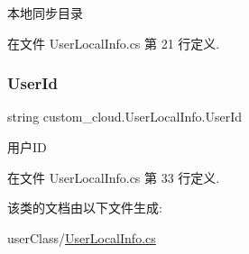 本地同步目录 



在文件 User\+Local\+Info.\+cs 第 21 行定义.

\mbox{\label{classcustom__cloud_1_1_user_local_info_a88a5abace43fab405e5b54d5b8548f96}} 
\subsubsection{\texorpdfstring{User\+Id}{UserId}}
{\footnotesize\ttfamily string custom\+\_\+cloud.\+User\+Local\+Info.\+User\+Id}



用户\+ID 



在文件 User\+Local\+Info.\+cs 第 33 行定义.



该类的文档由以下文件生成\+:\begin{DoxyCompactItemize}
\item 
user\+Class/\hyperlink{_user_local_info_8cs}{User\+Local\+Info.\+cs}\end{DoxyCompactItemize}
